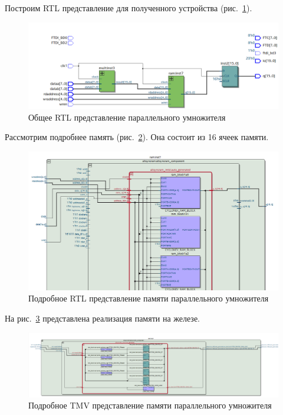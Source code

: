 \documentclass[a4paper,14pt]{article}
\begin{document}
Построим RTL представление для полученного устройства (рис.~\ref{fig:z1_rtl}).

\begin{figure}[H]
	\centering
	\includegraphics[width=\linewidth]{image/z1_rtl}
	\caption{Общее RTL представление параллельного умножителя}
	\label{fig:z1_rtl}
\end{figure}

Рассмотрим подробнее память (рис.~\ref{fig:z1_rtl2}).
Она состоит из 16 ячеек памяти.

\begin{figure}[H]
	\centering
	\includegraphics[width=\linewidth]{image/z1_rtl2}
	\caption{Подробное RTL представление памяти параллельного умножителя}
	\label{fig:z1_rtl2}
\end{figure}

На рис.~\ref{fig:z1_rtl3} представлена реализация памяти на железе.

\begin{figure}[H]
	\centering
	\includegraphics[width=\linewidth]{image/z1_rtl3}
	\caption{Подробное TMV представление памяти параллельного умножителя}
	\label{fig:z1_rtl3}
\end{figure}
\end{document}
